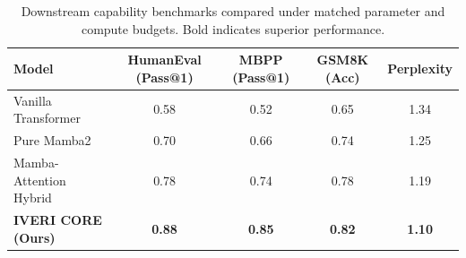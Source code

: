 \begin{table}[t]
\centering
\caption{Downstream capability benchmarks compared under matched parameter and compute budgets. Bold indicates superior performance.}
\label{tab:capability_benchmarks}
\begin{tabular}{lcccc}
\toprule
\textbf{Model} & \textbf{HumanEval (Pass@1)} & \textbf{MBPP (Pass@1)} & \textbf{GSM8K (Acc)} & \textbf{Perplexity} \\
\midrule
Vanilla Transformer & 0.58 & 0.52 & 0.65 & 1.34 \\
Pure Mamba2 & 0.70 & 0.66 & 0.74 & 1.25 \\
Mamba-Attention Hybrid & 0.78 & 0.74 & 0.78 & 1.19 \\
\textbf{IVERI CORE (Ours)} & \textbf{0.88} & \textbf{0.85} & \textbf{0.82} & \textbf{1.10} \\
\bottomrule
\end{tabular}
\end{table}
